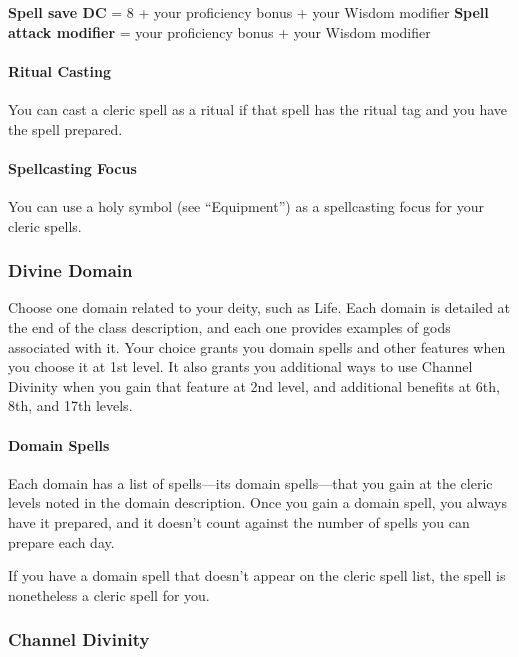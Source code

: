 \documentclass[
]{article}
\begin{document}
\textbf{Spell save DC} = 8 + your proficiency bonus + your Wisdom
modifier \textbf{Spell attack modifier} = your proficiency bonus + your
Wisdom modifier

\hypertarget{ritual-casting}{%
\paragraph{Ritual Casting}\label{ritual-casting}}

You can cast a cleric spell as a ritual if that spell has the ritual tag
and you have the spell prepared.

\hypertarget{spellcasting-focus}{%
\paragraph{Spellcasting Focus}\label{spellcasting-focus}}

You can use a holy symbol (see ``Equipment'') as a spellcasting focus
for your cleric spells.

\hypertarget{divine-domain}{%
\subsubsection{Divine Domain}\label{divine-domain}}

Choose one domain related to your deity, such as Life. Each domain is
detailed at the end of the class description, and each one provides
examples of gods associated with it. Your choice grants you domain
spells and other features when you choose it at 1st level. It also
grants you additional ways to use Channel Divinity when you gain that
feature at 2nd level, and additional benefits at 6th, 8th, and 17th
levels.

\hypertarget{domain-spells}{%
\paragraph{Domain Spells}\label{domain-spells}}

Each domain has a list of spells---its domain spells---that you gain at
the cleric levels noted in the domain description. Once you gain a
domain spell, you always have it prepared, and it doesn't count against
the number of spells you can prepare each day.

If you have a domain spell that doesn't appear on the cleric spell list,
the spell is nonetheless a cleric spell for you.

\hypertarget{channel-divinity}{%
\subsubsection{Channel Divinity}\label{channel-divinity}}
\end{document}

